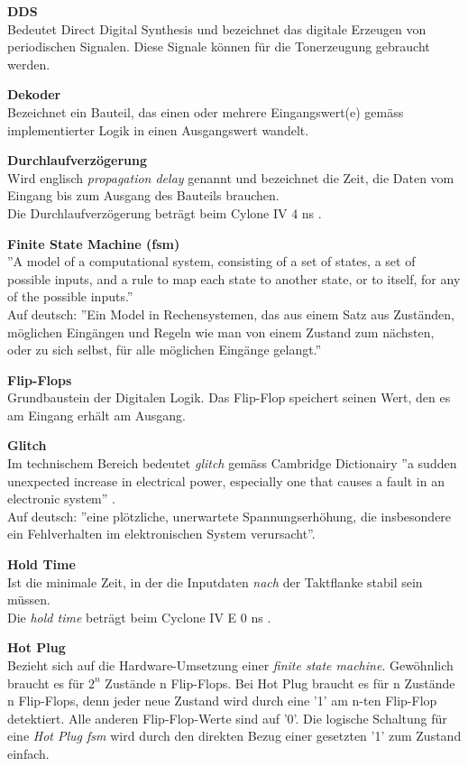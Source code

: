 \textbf{DDS}\\
Bedeutet Direct Digital Synthesis und bezeichnet das digitale Erzeugen von periodischen Signalen. Diese Signale können für die Tonerzeugung gebraucht werden.

\textbf{Dekoder}\\
Bezeichnet ein Bauteil, das einen oder mehrere Eingangswert(e) gemäss implementierter Logik in einen Ausgangswert wandelt.

\textbf{Durchlaufverzögerung}\\
Wird englisch \textit{propagation delay} genannt und bezeichnet die Zeit, die Daten vom Eingang bis zum Ausgang des Bauteils brauchen.\\
Die Durchlaufverzögerung beträgt beim Cylone IV 4 ns \citep{Handbook_Altera}.

\textbf{Finite State Machine (fsm)}\\
''A model of a computational system, consisting of a set of states, a set of possible inputs, and a rule to map each state to another state, or to itself, for any of the possible inputs.'' \citep{fsm}\\
Auf deutsch: ''Ein Model in Rechensystemen, das aus einem Satz aus Zuständen, möglichen Eingängen und Regeln wie man von einem Zustand zum nächsten, oder zu sich selbst, für alle möglichen Eingänge gelangt.''

\textbf{Flip-Flops}\\
Grundbaustein der Digitalen Logik. Das Flip-Flop speichert seinen Wert, den es am Eingang erhält am Ausgang.

\textbf{Glitch}\\
Im technischem Bereich bedeutet \textit{glitch} gemäss Cambridge Dictionairy ''a sudden unexpected increase in electrical power, especially one that causes a fault in an electronic system'' \citep{dictionair}.\\
Auf deutsch: ''eine plötzliche, unerwartete Spannungserhöhung, die insbesondere ein Fehlverhalten im elektronischen System verursacht''.

\textbf{Hold Time}\\
Ist die minimale Zeit, in der die Inputdaten \textit{nach} der Taktflanke stabil sein müssen.\\
Die \textit{hold time} beträgt beim  Cyclone IV E 0 ns \citep{Handbook_Altera}.

\textbf{Hot Plug}\\
Bezieht sich auf die Hardware-Umsetzung einer \textit{finite state machine}. Gewöhnlich braucht es für \begin{math} 2^n \end{math} Zustände n Flip-Flops. Bei Hot Plug braucht es für n Zustände n Flip-Flops, denn jeder neue Zustand wird durch eine '1' am n-ten Flip-Flop detektiert. Alle anderen Flip-Flop-Werte sind auf '0'. Die logische Schaltung für eine \textit{Hot Plug fsm} wird durch den direkten Bezug einer gesetzten '1' zum Zustand einfach.


